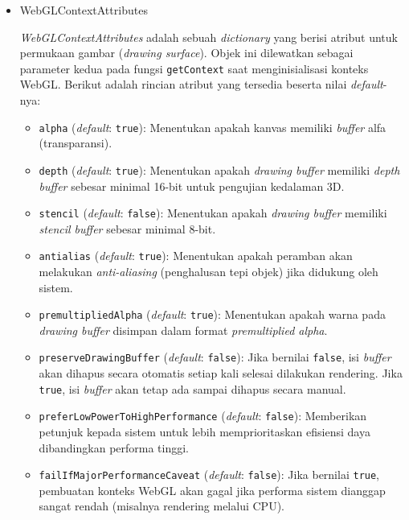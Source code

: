 \documentclass[a4paper,twoside]{article}
\begin{document}
\begin{enumerate}
\begin{itemize}
                \item{WebGLContextAttributes}
                \label{subsec:WebGLContextAttributes}
            
                    \textit{WebGLContextAttributes} adalah sebuah \textit{dictionary} yang berisi atribut untuk permukaan gambar (\textit{drawing surface}). Objek ini dilewatkan sebagai parameter kedua pada fungsi \texttt{getContext} saat menginisialisasi konteks WebGL. Berikut adalah rincian atribut yang tersedia beserta nilai \textit{default}-nya:
                    \begin{itemize}
                        \item \texttt{alpha} (\textit{default}: \texttt{true}): Menentukan apakah kanvas memiliki \textit{buffer} alfa (transparansi).
                        \item \texttt{depth} (\textit{default}: \texttt{true}): Menentukan apakah \textit{drawing buffer} memiliki \textit{depth buffer} sebesar minimal 16-bit untuk pengujian kedalaman 3D.
                        \item \texttt{stencil} (\textit{default}: \texttt{false}): Menentukan apakah \textit{drawing buffer} memiliki \textit{stencil buffer} sebesar minimal 8-bit.
                        \item \texttt{antialias} (\textit{default}: \texttt{true}): Menentukan apakah peramban akan melakukan \textit{anti-aliasing} (penghalusan tepi objek) jika didukung oleh sistem.
                        \item \texttt{premultipliedAlpha} (\textit{default}: \texttt{true}): Menentukan apakah warna pada \textit{drawing buffer} disimpan dalam format \textit{premultiplied alpha}.
                        \item \texttt{preserveDrawingBuffer} (\textit{default}: \texttt{false}): Jika bernilai \texttt{false}, isi \textit{buffer} akan dihapus secara otomatis setiap kali selesai dilakukan rendering. Jika \texttt{true}, isi \textit{buffer} akan tetap ada sampai dihapus secara manual.
                        \item \texttt{preferLowPowerToHighPerformance} (\textit{default}: \texttt{false}): Memberikan petunjuk kepada sistem untuk lebih memprioritaskan efisiensi daya dibandingkan performa tinggi.
                        \item \texttt{failIfMajorPerformanceCaveat} (\textit{default}: \texttt{false}): Jika bernilai \texttt{true}, pembuatan konteks WebGL akan gagal jika performa sistem dianggap sangat rendah (misalnya rendering melalui CPU).
                    \end{itemize}
            

\end{itemize}
\end{enumerate}
\end{document}
